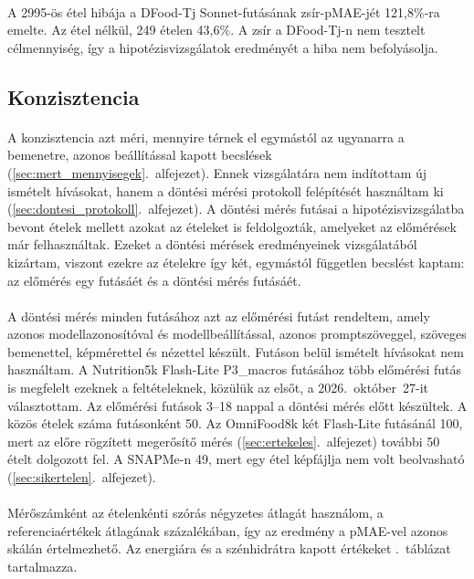 \paragraph{}A 2995-ös étel hibája a DFood-Tj Sonnet-futásának zsír-pMAE-jét 121,8\%-ra 
emelte. Az étel nélkül, 249 ételen 43,6\%. A zsír a DFood-Tj-n nem tesztelt 
célmennyiség, így a hipotézisvizsgálatok eredményét a hiba nem befolyásolja.

\subsection{Konzisztencia}
\label{sec:konzisztencia}
\paragraph{}A konzisztencia azt méri, mennyire térnek el egymástól az ugyanarra a 
bemenetre, azonos beállítással kapott becslések (\ref{sec:mert_mennyisegek}.~alfejezet). 
Ennek vizsgálatára nem indítottam új ismételt hívásokat, hanem a döntési mérési protokoll 
felépítését használtam ki (\ref{sec:dontesi_protokoll}.~alfejezet). A döntési mérés 
futásai a hipotézisvizsgálatba bevont ételek mellett azokat az ételeket is feldolgozták, 
amelyeket az előmérések már felhasználtak. Ezeket a döntési mérések eredményeinek vizsgálatából kizártam, viszont 
ezekre az ételekre így két, egymástól független becslést kaptam: az előmérés egy 
futásáét és a döntési mérés futásáét. 

\paragraph{}A döntési mérés minden futásához azt az előmérési futást rendeltem, amely 
azonos modellazonosítóval és modellbeállítással, azonos promptszöveggel, szöveges 
bemenettel, képmérettel és nézettel készült. Futáson belül ismételt hívásokat 
nem használtam. A Nutrition5k Flash-Lite P3\_macros futásához több előmérési futás is 
megfelelt ezeknek a feltételeknek, közülük az elsőt, a 2026.~október~27-it választottam. 
Az előmérési futások 3--18 nappal a döntési mérés előtt készültek. A közös ételek száma 
futásonként 50. Az OmniFood8k két Flash-Lite futásánál 100, mert az előre rögzített 
megerősítő mérés (\ref{sec:ertekeles}.~alfejezet) további 50 ételt dolgozott fel. A 
SNAPMe-n 49, mert egy étel képfájlja nem volt beolvasható (\ref{sec:sikertelen}.~alfejezet).

\paragraph{}Mérőszámként az ételenkénti szórás négyzetes átlagát használom, a 
referenciaértékek átlagának százalékában, így az eredmény a pMAE-vel azonos skálán 
értelmezhető. Az energiára és a szénhidrátra kapott értékeket 
\az{\ref{tab:konzisztencia}}.~táblázat tartalmazza.

